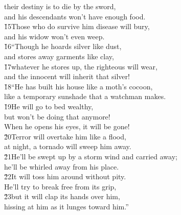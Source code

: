 \begin{poetry}
\poemll    their destiny is to die by the sword, \\
\poemll    and his descendants won't have enough food. \\
\poeml \v{15}Those who do survive him disease will bury, \\
\poemll    and his widow won't even weep. \\
\poeml \v{16}``Though he hoards silver like dust, \\
\poemll    and stores away garments like clay, \\
\poeml \v{17}whatever he stores up, the righteous will wear, \\
\poemll    and the innocent will inherit that silver! \\
\poeml \v{18}``He has built his house like a moth's cocoon, \\
\poemll    like a temporary sunshade that a watchman makes. \\
\poeml \v{19}He will go to bed wealthy, \\
\poemll    but won't be doing that anymore! \\
\poemlll       When he opens his eyes, it will be gone! \\
\poeml \v{20}Terror will overtake him like a flood, \\
\poemll    at night, a tornado will sweep him away. \\
\poeml \v{21}He'll be swept up by a storm wind and carried away; \\
\poemll    he'll be whirled away from his place. \\
\poeml \v{22}It will toss him around without pity. \\
\poemll    He'll try to break free from its grip, \\
\poeml \v{23}but it will clap its hands over him, \\
\poemll    hissing at him as it lunges toward him.''
\end{poetry}

